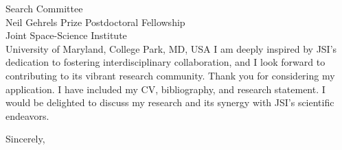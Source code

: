 \documentclass[11pt]{letter}
\begin{document}
\begin{letter}{Search Committee \\ Neil Gehrels Prize Postdoctoral Fellowship \\ Joint Space-Science Institute \\ University of Maryland, College Park, MD, USA}
I am deeply inspired by JSI’s dedication to fostering interdisciplinary collaboration, and I look forward to contributing to its vibrant research community. Thank you for considering my application. I have included my CV, bibliography, and research statement. I would be delighted to discuss my research and its synergy with JSI’s scientific endeavors.

\closing{Sincerely,}

\end{letter}
\end{document}
